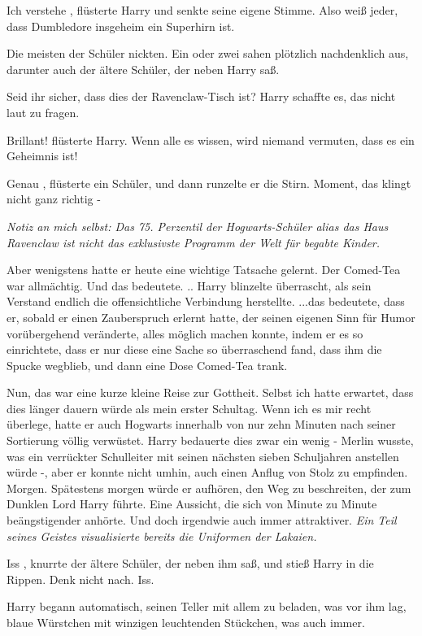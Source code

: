 \glqq Ich verstehe\grqq{} , flüsterte Harry und senkte seine eigene Stimme.
\glqq Also weiß jeder, dass Dumbledore insgeheim ein Superhirn ist.\grqq{}

Die meisten der Schüler nickten. Ein oder zwei sahen plötzlich nachdenklich aus,
darunter auch der ältere Schüler, der neben Harry saß.

Seid ihr sicher, dass dies der Ravenclaw-Tisch ist? Harry schaffte es, das nicht
laut zu fragen.

\glqq Brillant!\grqq{} flüsterte Harry. \glqq Wenn alle es wissen, wird niemand
vermuten, dass es ein Geheimnis ist!\grqq{}

\glqq Genau\grqq{} , flüsterte ein Schüler, und dann runzelte er die Stirn.
\glqq Moment, das klingt nicht ganz richtig -\grqq{}

\emph{Notiz an mich selbst: Das 75. Perzentil der Hogwarts-Schüler alias das
Haus Ravenclaw ist nicht das exklusivste Programm der Welt für begabte Kinder.}

Aber wenigstens hatte er heute eine wichtige Tatsache gelernt. Der Comed-Tea war
allmächtig. Und das bedeutete. .. Harry blinzelte überrascht, als sein Verstand
endlich die offensichtliche Verbindung herstellte. ...das bedeutete, dass er,
sobald er einen Zauberspruch erlernt hatte, der seinen eigenen Sinn für Humor
vorübergehend veränderte, alles möglich machen konnte, indem er es so
einrichtete, dass er nur diese eine Sache so überraschend fand, dass ihm die
Spucke wegblieb, und dann eine Dose Comed-Tea trank.

Nun, das war eine kurze kleine Reise zur Gottheit. Selbst ich hatte erwartet,
dass dies länger dauern würde als mein erster Schultag. Wenn ich es mir recht
überlege, hatte er auch Hogwarts innerhalb von nur zehn Minuten nach seiner
Sortierung völlig verwüstet. Harry bedauerte dies zwar ein wenig - Merlin
wusste, was ein verrückter Schulleiter mit seinen nächsten sieben Schuljahren
anstellen würde -, aber er konnte nicht umhin, auch einen Anflug von Stolz zu
empfinden. Morgen. Spätestens morgen würde er aufhören, den Weg zu beschreiten,
der zum Dunklen Lord Harry führte. Eine Aussicht, die sich von Minute zu Minute
beängstigender anhörte. Und doch irgendwie auch immer attraktiver. \emph{ Ein
Teil seines Geistes visualisierte bereits die Uniformen der Lakaien.}

\glqq Iss\grqq{} , knurrte der ältere Schüler, der neben ihm saß, und stieß
Harry in die Rippen. \glqq Denk nicht nach. Iss.\grqq{}

Harry begann automatisch, seinen Teller mit allem zu beladen, was vor ihm lag,
blaue Würstchen mit winzigen leuchtenden Stückchen, was auch immer.

